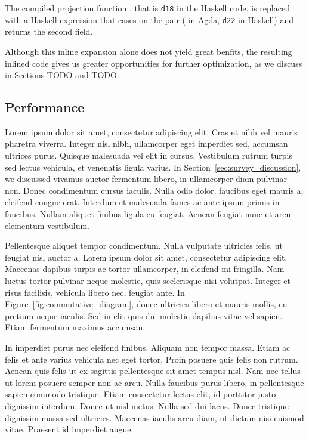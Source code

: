 The compiled projection function , that is \lstinline{d18} in the Haskell code, is replaced with a Haskell expression that cases on the pair ( in Agda, \lstinline{d22} in Haskell) and returns the second field.

Although this inline expansion alone does not yield great benfits, the resulting inlined code gives us greater opportunities for further optimization, as we discuss in Sections TODO and TODO.

\subsection{Performance}

Lorem ipsum dolor sit amet, consectetur adipiscing elit. Cras et nibh vel mauris pharetra viverra. Integer nisl nibh, ullamcorper eget imperdiet sed, accumsan ultrices purus. Quisque malesuada vel elit in cursus. Vestibulum rutrum turpis sed lectus vehicula, et venenatis ligula varius.  In Section~\ref{sec:survey_discussion}, we discussed vivamus auctor fermentum libero, in ullamcorper diam pulvinar non. Donec condimentum cursus iaculis. Nulla odio dolor, faucibus eget mauris a, eleifend congue erat. Interdum et malesuada fames ac ante ipsum primis in faucibus. Nullam aliquet finibus ligula eu feugiat. Aenean feugiat nunc et arcu elementum vestibulum. \newline

Pellentesque aliquet tempor condimentum. Nulla vulputate ultricies felis, ut feugiat nisl auctor a. Lorem ipsum dolor sit amet, consectetur adipiscing elit. Maecenas dapibus turpis ac tortor ullamcorper, in eleifend mi fringilla. Nam luctus tortor pulvinar neque molestie, quis scelerisque nisi volutpat. Integer et risus facilisis, vehicula libero nec, feugiat ante. In Figure~\ref{fig:commutative_diagram}, donec ultricies libero et mauris mollis, eu pretium neque iaculis. Sed in elit quis dui molestie dapibus vitae vel sapien. Etiam fermentum maximus accumsan. \newline



In imperdiet purus nec eleifend finibus. Aliquam non tempor massa. Etiam ac felis et ante varius vehicula nec eget tortor. Proin posuere quis felis non rutrum. Aenean quis felis ut ex sagittis pellentesque sit amet tempus nisl. Nam nec tellus ut lorem posuere semper non ac arcu. Nulla faucibus purus libero, in pellentesque sapien commodo tristique. Etiam consectetur lectus elit, id porttitor justo dignissim interdum. Donec ut nisl metus. Nulla sed dui lacus. Donec tristique dignissim massa sed ultricies. Maecenas iaculis arcu diam, ut dictum nisi euismod vitae. Praesent id imperdiet augue. 

